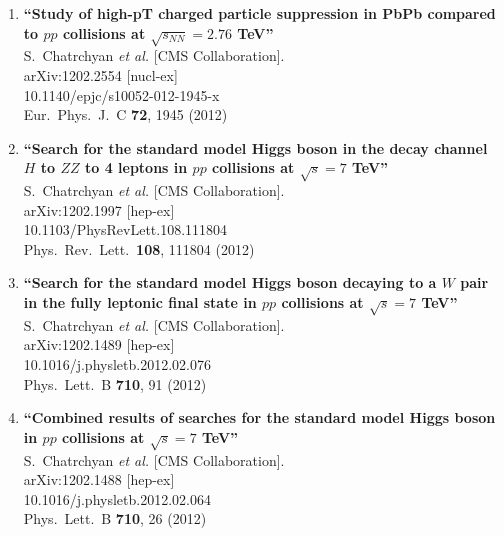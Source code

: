 \documentclass{article}
\begin{document}
\begin{enumerate}
\item%
{\bf ``Study of high-pT charged particle suppression in PbPb compared to $pp$ collisions at $\sqrt{s_{NN}}=2.76$ TeV''}
  \\{}S.~Chatrchyan {\it et al.}  [CMS Collaboration].
  \\{}arXiv:1202.2554 [nucl-ex]
    \\{}10.1140/epjc/s10052-012-1945-x
\\{}Eur.\ Phys.\ J.\ C {\bf 72}, 1945 (2012) %


\item%
{\bf ``Search for the standard model Higgs boson in the decay channel $H$ to $Z Z$ to 4 leptons in $pp$ collisions at $\sqrt{s}=7$ TeV''}
  \\{}S.~Chatrchyan {\it et al.}  [CMS Collaboration].
  \\{}arXiv:1202.1997 [hep-ex]
    \\{}10.1103/PhysRevLett.108.111804
\\{}Phys.\ Rev.\ Lett.\  {\bf 108}, 111804 (2012) %


\item%
{\bf ``Search for the standard model Higgs boson decaying to a $W$ pair in the fully leptonic final state in $pp$ collisions at $\sqrt{s}=7$ TeV''}
  \\{}S.~Chatrchyan {\it et al.}  [CMS Collaboration].
  \\{}arXiv:1202.1489 [hep-ex]
    \\{}10.1016/j.physletb.2012.02.076
\\{}Phys.\ Lett.\ B {\bf 710}, 91 (2012) %


\item%
{\bf ``Combined results of searches for the standard model Higgs boson in $pp$ collisions at $\sqrt{s}=7$ TeV''}
  \\{}S.~Chatrchyan {\it et al.}  [CMS Collaboration].
  \\{}arXiv:1202.1488 [hep-ex]
    \\{}10.1016/j.physletb.2012.02.064
\\{}Phys.\ Lett.\ B {\bf 710}, 26 (2012) %



\end{enumerate}
\end{document}
